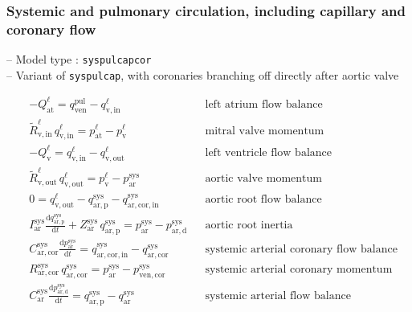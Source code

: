 \documentclass[a4paper,12pt]{report}
\begin{document}
\subsubsection{Systemic and pulmonary circulation, including capillary and coronary flow}

-- Model type : \verb"syspulcapcor"\\

-- Variant of \verb"syspulcap", with coronaries branching off directly after aortic valve

\begin{equation}
\label{equation-syspulcapcor-1}
\begin{aligned}
&-Q_{\mathrm{at}}^{\ell} = q_{\mathrm{ven}}^{\mathrm{pul}} - q_{\mathrm{v,in}}^{\ell} && \text{left atrium flow balance}\\
&\tilde{R}_{\mathrm{v,in}}^{\ell}\,q_{\mathrm{v,in}}^{\ell} = p_{\mathrm{at}}^{\ell}-p_{\mathrm{v}}^{\ell} && \text{mitral valve momentum}\nonumber\\
&-Q_{\mathrm{v}}^{\ell} = q_{\mathrm{v,in}}^{\ell} - q_{\mathrm{v,out}}^{\ell} && \text{left ventricle flow balance}\\
&\tilde{R}_{\mathrm{v,out}}^{\ell}\,q_{\mathrm{v,out}}^{\ell} = p_{\mathrm{v}}^{\ell}-p_{\mathrm{ar}}^{\mathrm{sys}} && \text{aortic valve momentum}\nonumber\\
&0 = q_{\mathrm{v,out}}^{\ell} - q_{\mathrm{ar,p}}^{\mathrm{sys}} - q_{\mathrm{ar,cor,in}}^{\mathrm{sys}} && \text{aortic root flow balance}\\
&I_{\mathrm{ar}}^{\mathrm{sys}} \frac{\mathrm{d}q_{\mathrm{ar,p}}^{\mathrm{sys}}}{\mathrm{d}t} + Z_{\mathrm{ar}}^{\mathrm{sys}}\,q_{\mathrm{ar,p}}^{\mathrm{sys}}=p_{\mathrm{ar}}^{\mathrm{sys}}-p_{\mathrm{ar,d}}^{\mathrm{sys}} && \text{aortic root inertia}\nonumber\\
&C_{\mathrm{ar,cor}}^{\mathrm{sys}} \frac{\mathrm{d}p_{\mathrm{ar}}^{\mathrm{sys}}}{\mathrm{d}t} = q_{\mathrm{ar,cor,in}}^{\mathrm{sys}} - q_{\mathrm{ar,cor}}^{\mathrm{sys}} && \text{systemic arterial coronary flow balance}\nonumber\\
&R_{\mathrm{ar,cor}}^{\mathrm{sys}}\,q_{\mathrm{ar,cor}}^{\mathrm{sys}} = p_{\mathrm{ar}}^{\mathrm{sys}} - p_{\mathrm{ven,cor}}^{\mathrm{sys}} && \text{systemic arterial coronary momentum}\\
&C_{\mathrm{ar}}^{\mathrm{sys}} \frac{\mathrm{d}p_{\mathrm{ar,d}}^{\mathrm{sys}}}{\mathrm{d}t} = q_{\mathrm{ar,p}}^{\mathrm{sys}} - q_{\mathrm{ar}}^{\mathrm{sys}}&& \text{systemic arterial flow balance}\nonumber\\

\end{aligned}
\end{equation}
\end{document}
